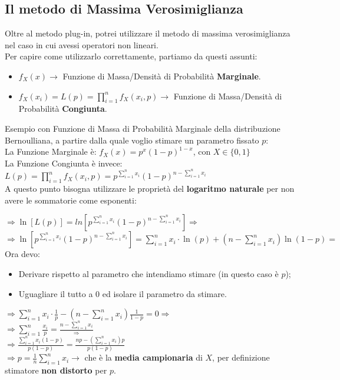 \documentclass{article}
\begin{document}
\subsection*{Il metodo di Massima Verosimiglianza}

Oltre al metodo plug-in, potrei utilizzare il metodo di massima verosimiglianza nel caso in cui avessi operatori non lineari. \\

Per capire come utilizzarlo correttamente, partiamo da questi assunti:

\begin{itemize}
    \item $f_X (x) \to$ Funzione di Massa/Densità di Probabilità \textbf{Marginale}.
    \item $f_X(x_i) = L(p) = \prod_{i=1}^{n} f_X(x_i, p) \to$ Funzione di Massa/Densità di Probabilità \textbf{Congiunta}.
\end{itemize}

Esempio con Funzione di Massa di Probabilità Marginale della distribuzione Bernoulliana, a partire dalla quale voglio stimare un parametro fissato $p$: \\

La Funzione Marginale è: $f_X(x) = p^x (1-p)^{1-x}$, con $X \in \{0,1\}$ \\

La Funzione Congiunta è invece: $L(p) = \prod_{i=1}^{n} f_X(x_i, p) = p^{\sum_{i=1}^{n}x_i} (1-p)^{n-\sum_{i=1}^{n} x_i}$ \\

A questo punto bisogna utilizzare le proprietà del \textbf{logaritmo naturale} per non avere le sommatorie come esponenti:

$\Rightarrow \ln[L(p)] = ln[p^{\sum_{i=1}^{n}x_i} (1-p)^{n-\sum_{i=1}^{n} x_i}] \Rightarrow$ \\
$\Rightarrow \ln[p^{\sum_{i=1}^{n}x_i} (1-p)^{n-\sum_{i=1}^{n} x_i}] = \sum_{i=1}^{n} x_i \cdot \ln(p) + (n - \sum_{i=1}^{n} x_i) \ln(1-p) =$ \\

Ora devo:
\begin{itemize}
    \item Derivare rispetto al parametro che intendiamo stimare (in questo caso è $p$);
    \item Uguagliare il tutto a 0 ed isolare il parametro da stimare.
\end{itemize}

$\Rightarrow \sum_{i=1}^{n} x_i \cdot \frac{1}{p} - (n - \sum_{i=1}^{n} x_i) \frac{1}{1-p} = 0 \Rightarrow$ \\
$\Rightarrow \sum_{i=1}^{n} \frac{x_i}{p} = \frac{n-\sum_{i=1}^{n} x_i} \Rightarrow$ \\
$\Rightarrow \frac{\sum_{i=1}^{n} x_i (1-p)}{p(1-p)} = \frac{np - (\sum_{i=1}^{n} x_i)p}{p(1-p)}$ \\
$\Rightarrow p = \frac{1}{n} \sum_{i=1}^{n} x_i \to$ che è la \textbf{media campionaria} di $X$, per definizione stimatore \textbf{non distorto} per $p$.
\end{document}
